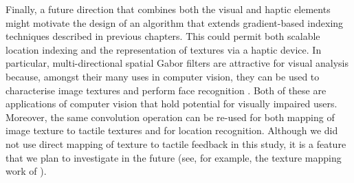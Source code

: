Finally, a future direction that combines both the visual and haptic elements might motivate the design of an algorithm that extends gradient-based indexing techniques described in previous chapters. This could permit both scalable location indexing and the representation of textures via a haptic device. In particular, multi-directional spatial Gabor filters are attractive for visual analysis because, amongst their many uses in computer vision, they can be used to characterise image textures \citep{jain1990unsupervised,weldon1996efficient,adi2009texture} and perform face recognition \citep{yang2013gabor}. Both of these are applications of computer vision that hold potential for visually impaired users. Moreover, the same convolution operation can be re-used for both mapping of image texture to tactile textures and for location recognition. Although we did not use direct mapping of texture to tactile feedback in this study, it is a feature that we plan to investigate in the future (see, for example, the texture mapping work of \citet{adi2009texture}). 

